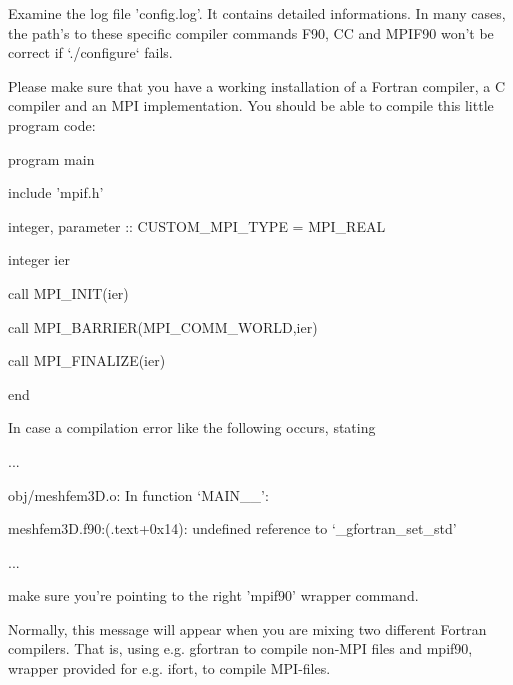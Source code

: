 \documentclass[oneside,english]{book}
\newenvironment{lyxcode}
{\begin{list}{}{
\setlength{\rightmargin}{\leftmargin}
\setlength{\listparindent}{0pt}%
\raggedright
\setlength{\itemsep}{0pt}
\setlength{\parsep}{0pt}
\normalfont\ttfamily}%
 \item[]}
{\end{list}}
\begin{document}
\begin{description}
\item [configuration fails:]
   Examine the log file 'config.log'. It contains detailed informations.
   In many cases, the path's to these specific compiler commands F90,
   CC and MPIF90 won't be correct if `./configure` fails.

   Please make sure that you have a working installation of a Fortran compiler,
   a C compiler and an MPI implementation. You should be able to compile this
   little program code:
\begin{lyxcode}
{\footnotesize      program main }{\footnotesize \par}
{\footnotesize        include 'mpif.h' }{\footnotesize \par}
{\footnotesize        integer, parameter :: CUSTOM\_MPI\_TYPE = MPI\_REAL }{\footnotesize \par}
{\footnotesize        integer ier }{\footnotesize \par}
{\footnotesize        call MPI\_INIT(ier) }{\footnotesize \par}
{\footnotesize        call MPI\_BARRIER(MPI\_COMM\_WORLD,ier) }{\footnotesize \par}
{\footnotesize        call MPI\_FINALIZE(ier) }{\footnotesize \par}
{\footnotesize      end}{\footnotesize \par}
\end{lyxcode}


\item [compilation fails:] In case a compilation error like the following occurs, stating
\begin{lyxcode}
{\footnotesize    ...  }{\footnotesize \par}
{\footnotesize    obj/meshfem3D.o: In function `MAIN\_\_':  }{\footnotesize \par}
{\footnotesize    meshfem3D.f90:(.text+0x14): undefined reference to `\_gfortran\_set\_std'  }{\footnotesize \par}
{\footnotesize    ...  }{\footnotesize \par}
\end{lyxcode}
  make sure you're pointing to the right 'mpif90' wrapper command.

  Normally, this message will appear when you are mixing two different Fortran
  compilers. That is, using e.g. gfortran to compile non-MPI files
  and mpif90, wrapper provided for e.g. ifort, to compile MPI-files.


\end{description}
\end{document}

